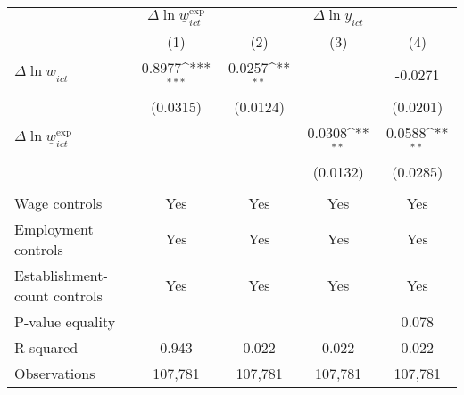 {
\def\sym#1{\ifmmode^{#1}\else\(^{#1}\)\fi}
\begin{tabular}{l*{4}{c}}
\hline\hline
          &\multicolumn{1}{c}{$\Delta \ln \underline{w}_{ict}^{\text{exp}}$}&\multicolumn{3}{c}{$\Delta \ln y_{ict}$}                \\\cmidrule(lr){2-2}\cmidrule(lr){3-5}
          &\multicolumn{1}{c}{(1)}         &\multicolumn{1}{c}{(2)}         &\multicolumn{1}{c}{(3)}         &\multicolumn{1}{c}{(4)}         \\
\hline
$\Delta \ln \underline{w}_{ict}$&   0.8977\sym{***}&   0.0257\sym{**} &                  &  -0.0271         \\
          & (0.0315)         & (0.0124)         &                  & (0.0201)         \\
[1em]
$\Delta \ln \underline{w}_{ict}^{\text{exp}}$&                  &                  &   0.0308\sym{**} &   0.0588\sym{**} \\
          &                  &                  & (0.0132)         & (0.0285)         \\
\hline
\vspace{-2mm}&                  &                  &                  &                  \\
Wage controls&      Yes         &      Yes         &      Yes         &      Yes         \\
Employment controls&      Yes         &      Yes         &      Yes         &      Yes         \\
Establishment-count controls&      Yes         &      Yes         &      Yes         &      Yes         \\
P-value equality&                  &                  &                  &    0.078         \\
R-squared &    0.943         &    0.022         &    0.022         &    0.022         \\
Observations&  107,781         &  107,781         &  107,781         &  107,781         \\
\hline\hline
\end{tabular}
}
